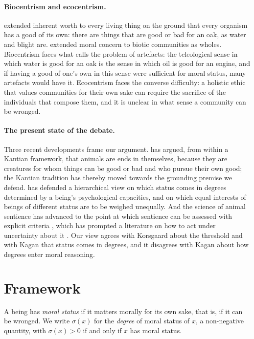 \documentclass{situationist-preprint}
\begin{document}
\paragraph{Biocentrism and ecocentrism.} \citet{Taylor1986} extended inherent worth to every living thing on the ground that every organism has a good of its own: there are things that are good or bad for an oak, as water and blight are. \citet{Leopold1949} extended moral concern to biotic communities as wholes. Biocentrism faces what \citet{Basl2019} calls the problem of artefacts: the teleological sense in which water is good for an oak is the sense in which oil is good for an engine, and if having a good of one's own in this sense were sufficient for moral status, many artefacts would have it. Ecocentrism faces the converse difficulty: a holistic ethic that values communities for their own sake can require the sacrifice of the individuals that compose them, and it is unclear in what sense a community can be wronged.

\paragraph{The present state of the debate.} Three recent developments frame our argument. \citet{Korsgaard2018} has argued, from within a Kantian framework, that animals are ends in themselves, because they are creatures for whom things can be good or bad and who pursue their own good; the Kantian tradition has thereby moved towards the grounding premise we defend. \citet{Kagan2019} has defended a hierarchical view on which status comes in degrees determined by a being's psychological capacities, and on which equal interests of beings of different status are to be weighed unequally. And the science of animal sentience has advanced to the point at which sentience can be assessed with explicit criteria \citep{Birch2020,Browning2022}, which has prompted a literature on how to act under uncertainty about it \citep{Birch2024}. Our view agrees with Korsgaard about the threshold and with Kagan that status comes in degrees, and it disagrees with Kagan about how degrees enter moral reasoning.

\section{Framework}

\begin{definition}\label{d:status}
A being has \emph{moral status} if it matters morally for its own sake, that is, if it can be wronged. We write $\sigma(x)$ for the \emph{degree} of moral status of $x$, a non-negative quantity, with $\sigma(x) > 0$ if and only if $x$ has moral status.
\end{definition}
\end{document}
